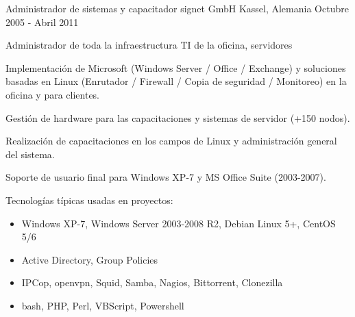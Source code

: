 \begin{cventries}
  \cventry
    {Administrador de sistemas y capacitador}
    {signet GmbH} %
    {Kassel, Alemania} %
    {Octubre 2005 - Abril 2011} %
    {
      \begin{cvitems} %
      \item Administrador de toda la infraestructura TI de la oficina, servidores
      \item Implementación de Microsoft (Windows Server / Office / Exchange) y soluciones basadas en Linux
        (Enrutador / Firewall / Copia de seguridad / Monitoreo) en la oficina y para clientes.
      \item Gestión de hardware para las capacitaciones y sistemas de servidor (+150 nodos).
      \item Realización de capacitaciones en los campos de Linux y administración general del sistema.
      \item Soporte de usuario final para Windows XP-7 y MS Office Suite (2003-2007).
      \item Tecnologías típicas usadas en proyectos:
        \begin{itemize}
          \item Windows XP-7, Windows Server 2003-2008 R2, Debian Linux 5+, CentOS 5/6
          \item Active Directory, Group Policies
          \item IPCop, openvpn, Squid, Samba, Nagios, Bittorrent, Clonezilla
          \item bash, PHP, Perl, VBScript, Powershell
        \end{itemize}
      \end{cvitems}
    }

\end{cventries}
